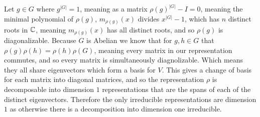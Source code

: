 \documentclass[12pt]{amsart}
\begin{document}
\begin{itemize}
     Let $g\in G$ where $g^{|G|}=1$, meaning as a matrix $\rho(g)^{|G|}-I=0$, meaning the 
     minimal polynomial of $\rho(g)$, $m_{\rho(g)}(x)$ divides $x^{|G|}-1$, which has 
     $n$ distinct roots in $\mathbb{C}$, meaning $m_{\rho(g)}(x)$ has all distinct roots, and so $\rho(g)$ is diagonalizable.
     Because $G$ is Abelian we know that for $g,h\in G$ that $\rho(g)\rho(h)=\rho(h)\rho(G)$, meaning every matrix 
     in our representation commutes, and so every matrix is 
     simultaneously diagnolizable. Which means they all share eigenvectors which form a basis for $V$. 
     This gives a change of basis for each matrix into diagonal matrices, and so the representation 
     $\rho$ is decomposable into dimension $1$ representations that are the spans of each of the 
     distinct eigenvectors. Therefore the only irreducible representations are dimension $1$ as otherwise 
     there is a decomposition into dimension one irreducible.\\


\end{itemize}
\end{document}
